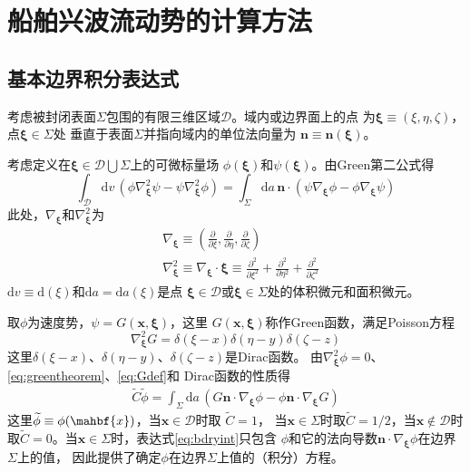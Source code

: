 \chapter{船舶兴波流动势的计算方法}
\label{chap:fsG}

\section{基本边界积分表达式}
\label{sec:bdryint}
考虑被封闭表面$\Sigma$包围的有限三维区域$\mathcal{D}$。域内或边界面上的点
为$\bm{\xi}\equiv(\xi,\eta,\zeta)$，点$\bm{\xi}\in\Sigma$处
垂直于表面$\Sigma$并指向域内的单位法向量为
$\mathbf{n}\equiv\mathbf{n}(\bm{\xi})$。

考虑定义在$\bm{\xi}\in\mathcal{D}\bigcup\Sigma$上的可微标量场
$\phi(\bm{\xi})$和$\psi(\bm{\xi})$。由Green第二公式得
\begin{equation}
  \int_\mathcal{D}\mathrm{d}v\,(\phi\nabla^2_\mathbf{\xi}\psi
  -\psi\nabla^2_{\mathbf{\xi}}\phi)
  =\int_\Sigma\mathrm{d}a\,\mathbf{n}\cdot(
  \psi\nabla_\mathbf{\xi}\phi
  -\phi\nabla_\mathbf{\xi}\psi
  )
  \label{eq:greentheorem}
\end{equation}
此处，$\nabla_\bm{\xi}$和$\nabla^2_\bm{\xi}$为
\begin{eqnarray}
  &\nabla_\mathbf{\xi}\equiv(\frac{\partial}{\partial\xi},
  \frac{\partial}{\partial\eta},\frac{\partial}{\partial\zeta})
  \label{eq:diff}\\
  &\nabla^2_\mathbf{\xi}\equiv\nabla_\mathbf{\xi}\cdot\mathbf{\xi}
  \equiv\frac{\partial^2}{\partial\xi^2}+\frac{\partial^2}{\partial\eta^2}
  +\frac{\partial^2}{\partial\zeta^2}\label{eq:laplace}
\end{eqnarray}
$\mathrm{d}v\equiv \mathrm{d}(\xi)$和$\mathrm{d}a=\mathrm{d}a(\xi)$是点
$\bm{\xi}\in\mathcal{D}$或$\bm{\xi}\in\Sigma$处的体积微元和面积微元。

取$\phi$为速度势，$\psi=G(\mathbf{x},\bm{\xi})$，这里
$G(\mathbf{x},\bm{\xi})$称作Green函数，满足Poisson方程
\begin{equation}
  \nabla^2_\mathbf{\xi}G=\delta(\xi-x)\delta(\eta-y)\delta(\zeta-z)
  \label{eq:Gdef}
\end{equation}
这里$\delta(\xi-x)$、$\delta(\eta-y)$、$\delta(\zeta-z)$是Dirac函数。
由$\nabla^2_{\bm{\xi}}\phi=0$、\eqref{eq:greentheorem}、\eqref{eq:Gdef}和
Dirac函数的性质得
\begin{eqnarray}
  \widetilde{C}\widetilde{\phi}=
  \int_\Sigma\mathrm{d}a\,(
  G\mathbf{n}\cdot\nabla_\mathbf{\xi}\phi
  -\phi\mathbf{n}\cdot\nabla_\mathbf{\xi}G
  )
  \label{eq:bdryint}
\end{eqnarray}
这里$\widetilde{\phi}\equiv\phi(\mahbf{x})$，当$\mathbf{x}\in\mathcal{D}$时取
$\widetilde{C}=1$，
当$\mathbf{x}\in\Sigma$时取$\widetilde{C}=1/2$，当$\mathbf{x}\notin\mathcal{D}$时取$\widetilde{C}=0$。当$\mathbf{x}\in\Sigma$时，表达式\eqref{eq:bdryint}只包含
$\phi$和它的法向导数$\mathbf{n}\cdot\nabla_{\bm{\xi}}\phi$在边界$\Sigma$上的值，
因此提供了确定$\phi$在边界$\Sigma$上值的（积分）方程。

